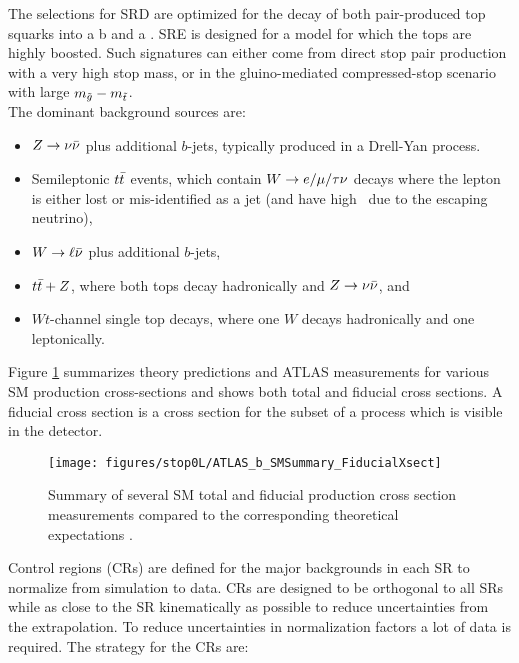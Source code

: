 The selections for SRD are optimized for the decay of both pair-produced top squarks into a b and a \chinoonepm. SRE is designed for a model for which the tops are highly boosted. Such signatures can either come from direct stop pair production with a very high stop mass, or in the gluino-mediated compressed-stop scenario with large $m_{\tilde{g}} - m_{\tilde{t}}$. \\


The dominant background sources are:

\begin{itemize}
\item $Z\rightarrow \nu \bar{\nu}$ plus additional $b$-jets, typically produced in a Drell-Yan process.  
\item Semileptonic $t\bar{t}$ events, which contain $W \rightarrow e/\mu/\tau \nu$ decays where the lepton is either lost or mis-identified as a jet (and have high \met\ due to the escaping neutrino),
\item $W\rightarrow \ell \bar{\nu}$ plus additional $b$-jets, 
\item $t\bar{t}+Z$, where both tops decay hadronically and $Z\rightarrow \nu \bar{\nu}$, and
\item $Wt$-channel single top decays, where one $W$ decays hadronically and one leptonically.
\end{itemize}

Figure \ref{fig:atlasbsmsummaryfiducialxsect} summarizes theory predictions and ATLAS measurements for various SM production cross-sections and shows both total and fiducial cross sections.  A fiducial cross section is a cross section for the subset of a process which is visible in the detector.  

\begin{figure}[tbh!]
	\centering
	\texttt{[image: figures/stop0L/ATLAS\_b\_SMSummary\_FiducialXsect]}
	\caption{Summary of several SM total and fiducial production cross section measurements compared to the corresponding theoretical expectations {\cite{atlassmsummaryplots}}.}
	\label{fig:atlasbsmsummaryfiducialxsect}
\end{figure}


Control regions (CRs) are defined for the major backgrounds in each SR to normalize from simulation to data.  CRs are designed to be orthogonal to all SRs while as close to the SR kinematically as possible to reduce uncertainties from the extrapolation.  To reduce uncertainties in normalization factors a lot of data is required.  The strategy for the CRs are:

